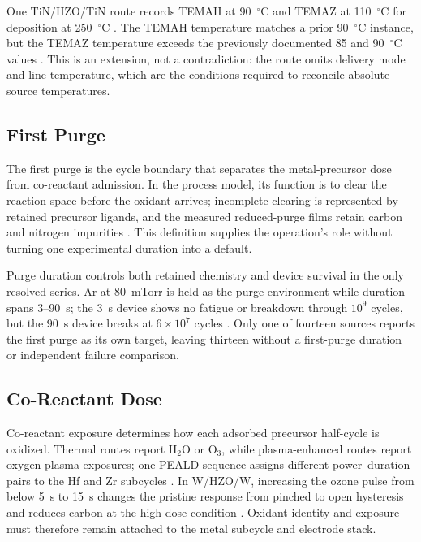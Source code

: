 \documentclass[11pt,a4paper]{report}
\begin{document}
One TiN/HZO/TiN route records TEMAH at 90~$^\circ$C and TEMAZ at 110~$^\circ$C for deposition at 250~$^\circ$C \cite{tsai2022stress}. The TEMAH temperature matches a prior 90~$^\circ$C instance, but the TEMAZ temperature exceeds the previously documented 85 and 90~$^\circ$C values \cite{choi2025purge,kashir2021wake}. This is an extension, not a contradiction: the route omits delivery mode and line temperature, which are the conditions required to reconcile absolute source temperatures.
\subsection{First Purge}
\label{sec:ald-first-purge}

The first purge is the cycle boundary that separates the metal-precursor dose from co-reactant admission. In the process model, its function is to clear the reaction space before the oxidant arrives; incomplete clearing is represented by retained precursor ligands, and the measured reduced-purge films retain carbon and nitrogen impurities \cite{choi2025purge}. This definition supplies the operation's role without turning one experimental duration into a default.

Purge duration controls both retained chemistry and device survival in the only resolved series. Ar at 80~mTorr is held as the purge environment while duration spans 3--90~s; the 3~s device shows no fatigue or breakdown through $10^9$ cycles, but the 90~s device breaks at $6\times10^7$ cycles \cite{choi2025purge}. Only one of fourteen sources reports the first purge as its own target, leaving thirteen without a first-purge duration or independent failure comparison.

\subsection{Co-Reactant Dose}
\label{sec:ald-co-reactant-dose}

Co-reactant exposure determines how each adsorbed precursor half-cycle is oxidized. Thermal routes report H$_2$O or O$_3$, while plasma-enhanced routes report oxygen-plasma exposures; one PEALD sequence assigns different power--duration pairs to the Hf and Zr subcycles \cite{song2021ferro,choi2025purge,kim2020tin,song2023seed}. In W/HZO/W, increasing the ozone pulse from below 5~s to 15~s changes the pristine response from pinched to open hysteresis and reduces carbon at the high-dose condition \cite{kashir2021wake}. Oxidant identity and exposure must therefore remain attached to the metal subcycle and electrode stack.
\end{document}
